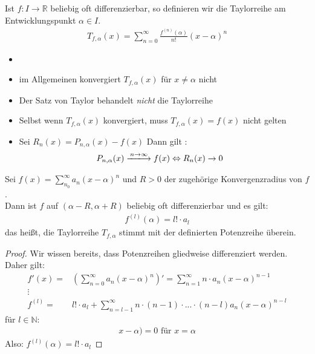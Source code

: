 
\begin{Definition}{
	Ist $f: I \rightarrow \mathbb{R}$ beliebig oft differenzierbar, so definieren 
	wir die Taylorreihe am Entwicklungspunkt $\alpha \in I$.
	\begin{align*}
		T_{f, \alpha} (x) = \sum_{n = 0}^{\infty} \frac{f^{(n)}(\alpha)}{n!}
		(x- \alpha)^n
	\end{align*}
}\end{Definition}

\begin{Bemerkung}{ 
	\begin{itemize}
		\item[ ]
		\item im Allgemeinen konvergiert $T_{f,\alpha}(x)$ für $x \neq \alpha$ nicht
		\item Der Satz von Taylor behandelt \emph{nicht} die Taylorreihe
		\item Selbst wenn $T_{f, \alpha}(x)$ konvergiert, muss 
		$T_{f,\alpha}(x) = f(x)$ nicht gelten
		\item Sei $R_n(x) = P_{n, \alpha}(x) -f(x)$ Dann gilt :
		\begin{align*}
			P_{n,\alpha}(x) \xlongrightarrow{n \rightarrow \infty} f(x) 
			& \Leftrightarrow  R_n (x) \rightarrow 0
		\end{align*}
	\end{itemize}
}\end{Bemerkung}

\begin{Satz}{
	Sei $f(x) = \sum_{n_0}^{\infty} a_n (x- \alpha)^n $ und $R > 0$ der zugehörige 
	Konvergenzradius von $f$.\\
	Dann ist $f$ auf $(\alpha -R, \alpha + R)$ beliebig oft differenzierbar und 
	es gilt:
	\begin{align*}
		f^{(l)}(\alpha) = l ! \cdot a_l
	\end{align*}
	das heißt, die Taylorreihe $T_{f,\alpha}$ stimmt mit der definierten 
	Potenzreihe überein.
}\end{Satz}

\begin{proof}
	Wir wissen bereits, dass Potenzreihen gliedweise differenziert
	 werden. Daher gilt: 
	 \begin{align*}
	 	f'(x) = & \left( \sum_{n = 0}^{\infty} a_n (x- \alpha)^n \right) '
	 	 =  \sum_{n= 1}^{\infty}n \cdot a_n (x- \alpha)^{n-1} \\
	 	\vdots \\
	 	f^{(l)} = & l! \cdot a_l + \sum_{n = l-1}^{\infty} n \cdot (n-1) \cdot 
	 	... \cdot (n-l) a_n(x-\alpha)^{n-l}
	 \end{align*}
	 für $l \in \mathbb{N}$: 
	 \begin{align*}
		 x - \alpha) = 0 \text{ für } x = \alpha
	 \end{align*}
	 Also: $f^{(l)}(\alpha) = l! \cdot a_l$
\end{proof}
\cleardoublepage
